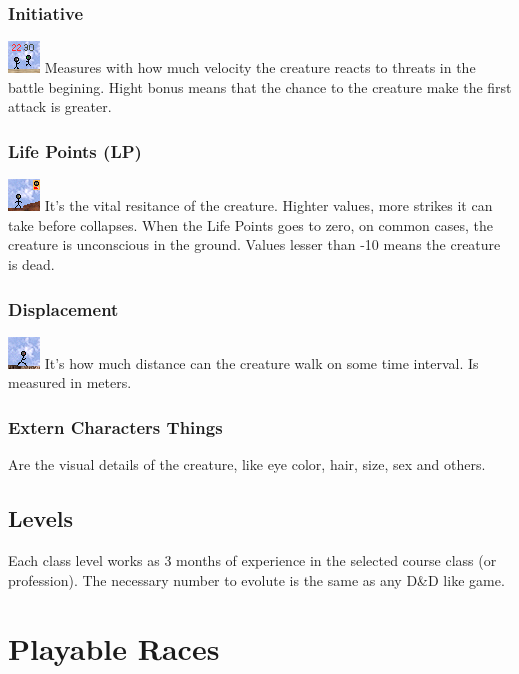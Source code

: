 \documentclass[ letterpaper,12pt]{article}
\begin{document}
\subsubsection{Initiative}
\includegraphics{../data/skills/Img/iniciativa.png}
Measures with how much velocity the creature reacts to threats in the battle begining. Hight bonus means that the chance to the creature make the first attack is greater.

\subsubsection{Life Points (LP)}
\includegraphics{../data/skills/Img/pv.png}
It's the vital resitance of the creature. Highter values, more strikes it can take before collapses. When the Life Points goes to zero, on common cases, the creature is unconscious in the ground. Values lesser than -10 means the creature is dead.

\subsubsection{Displacement}
\includegraphics{../data/skills/Img/deslocamento.png}
It's how much distance can the creature walk on some time interval. Is measured in meters.

\subsubsection{Extern Characters Things}
Are the visual details of the creature, like eye color, hair, size, sex and others.

\subsection{Levels}
Each class level works as 3 months of experience in the selected course class (or profession). The necessary number to evolute is the same as any D\&D like game.

\section{Playable Races}
\end{document}
